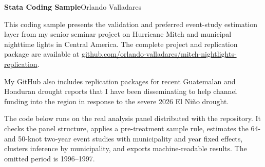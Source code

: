 \documentclass[10pt]{article}
\begin{document}
{\Large\bfseries Stata Coding Sample}\hfill Orlando Valladares

This coding sample presents the validation and preferred event-study estimation layer from my senior seminar project on Hurricane Mitch and municipal nighttime lights in Central America. The complete project and replication package are available at \href{https://github.com/orlando-valladares/mitch-nightlights-replication}{github.com/orlando-valladares/mitch-nightlights-replication}.

My GitHub also includes replication packages for recent Guatemalan and Honduran drought reports that I have been disseminating to help channel funding into the region in response to the severe 2026 El Ni\~no drought.

The code below runs on the real analysis panel distributed with the repository. It checks the panel structure, applies a pre-treatment sample rule, estimates the 64- and 50-knot two-year event studies with municipality and year fixed effects, clusters inference by municipality, and exports machine-readable results. The omitted period is 1996--1997.


\end{document}
